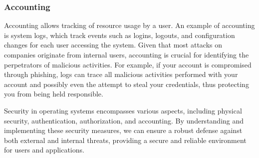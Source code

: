 \subsubsection{Accounting}
Accounting allows tracking of resource usage by a user. An example of accounting is system logs, which track events such as logins, logouts, and configuration changes for each user accessing the system. Given that most attacks on companies originate from internal users, accounting is crucial for identifying the perpetrators of malicious activities. For example, if your account is compromised through phishing, logs can trace all malicious activities performed with your account and possibly even the attempt to steal your credentials, thus protecting you from being held responsible.

Security in operating systems encompasses various aspects, including physical security, authentication, authorization, and accounting. By understanding and implementing these security measures, we can ensure a robust defense against both external and internal threats, providing a secure and reliable environment for users and applications.
